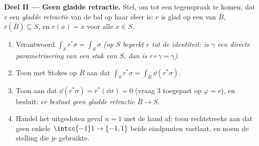 \begin{problem}
\medskip
\noindent\textbf{Deel II --- Geen gladde retractie.} Stel, om tot
een tegenspraak te komen, dat $r$ een \emph{gladde retractie} van
de bal op haar sfeer is: $r$ is glad op een  van $\bar
B$, $r(\bar B) \subseteq S$, en $r(x) = x$ voor alle $x \in S$.
\begin{enumerate}[resume]
  \item Verantwoord $\int_Sr^*\sigma = \int_S\sigma$ \emph{(op
        $S$ beperkt $r$ tot de identiteit: is $\gamma$ een
        directe parametrisering van een stuk van $S$, dan is
        $r\circ\gamma = \gamma$)}.
  \item Toon met Stokes op $\bar B$ aan dat $\int_Sr^*\sigma =
        \int_{\bar B}\dd(r^*\sigma)$.
  \item Toon aan dat $\dd(r^*\sigma) = r^*(\dd\sigma) = 0$ (vraag
        3 toegepast op $\varphi = r$), en besluit: \emph{er
        bestaat geen gladde retractie $\bar B \to S$.}
  \item Handel het uitgesloten geval $n = 1$ met de hand af: toon
        rechtstreeks aan dat geen enkele 
        $\intcc{-1}1 \to \{-1, 1\}$ beide eindpunten vastlaat, en
        noem de stelling die je gebruikte.
\end{enumerate}


\end{problem}
